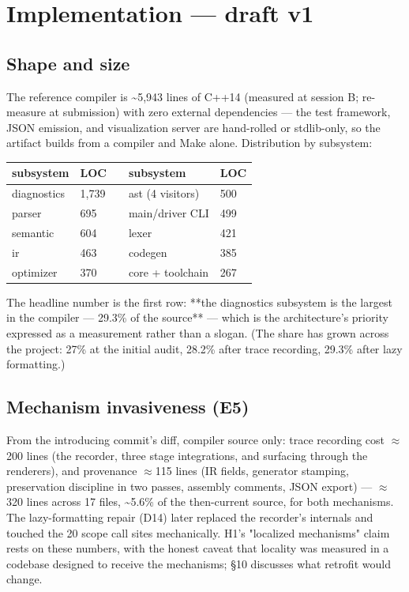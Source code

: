 \section{Implementation --- draft v1}
\label{sec:impl}

\subsection{Shape and size}

The reference compiler is \textasciitilde{}5,943 lines of C++14 (measured at session
B; re-measure at submission) with zero external dependencies --- the
test framework, JSON emission, and visualization server are
hand-rolled or stdlib-only, so the artifact builds from a compiler
and Make alone. Distribution by subsystem:

\begin{table}[t]
\centering
\small
\begin{tabular}{lllll}
\toprule
subsystem & LOC &  & subsystem & LOC \\
\midrule
diagnostics & 1,739 &  & ast (4 visitors) & 500 \\
parser & 695 &  & main/driver CLI & 499 \\
semantic & 604 &  & lexer & 421 \\
ir & 463 &  & codegen & 385 \\
optimizer & 370 &  & core + toolchain & 267 \\
\bottomrule
\end{tabular}
\end{table}

The headline number is the first row: **the diagnostics subsystem is
the largest in the compiler --- 29.3\% of the source** --- which is the
architecture's priority expressed as a measurement rather than a
slogan. (The share has grown across the project: 27\% at the initial
audit, 28.2\% after trace recording, 29.3\% after lazy formatting.)

\subsection{Mechanism invasiveness (E5)}

From the introducing commit's diff, compiler source only: trace
recording cost $\approx$200 lines (the recorder, three stage integrations,
and surfacing through the renderers), and provenance $\approx$115 lines (IR
fields, generator stamping, preservation discipline in two passes,
assembly comments, JSON export) --- $\approx$320 lines across 17 files, \textasciitilde{}5.6\%
of the then-current source, for both mechanisms. The lazy-formatting
repair (D14) later replaced the recorder's internals and touched the
20 scope call sites mechanically. H1's "localized mechanisms" claim
rests on these numbers, with the honest caveat that locality was
measured in a codebase designed to receive the mechanisms; \S10
discusses what retrofit would change.


